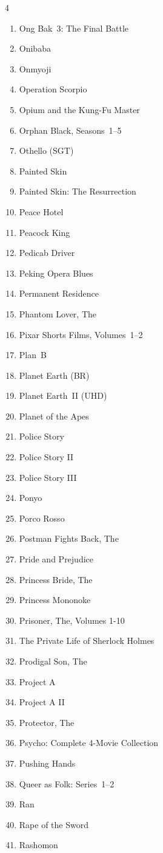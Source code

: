 \documentclass{article}
\begin{document}
\begin{multicols}{4}
\begin{enumerate}
\item Ong Bak~3: The Final Battle
\item Onibaba
\item Onmyoji
\item Operation Scorpio
\item Opium and the Kung-Fu Master
\item Orphan Black, Seasons~1--5
\item Othello (SGT)
\item Painted Skin
\item Painted Skin: The Resurrection
\item Peace Hotel
\item Peacock King
\item Pedicab Driver
\item Peking Opera Blues
\item Permanent Residence
\item Phantom Lover, The
\item Pixar Shorts Films, Volumes~1--2
\item Plan~B
\item Planet Earth (BR)
\item Planet Earth~II (UHD)
\item Planet of the Apes
\item Police Story
\item Police Story II
\item Police Story III
\item Ponyo
\item Porco Rosso
\item Postman Fights Back, The
\item Pride and Prejudice
\item Princess Bride, The
\item Princess Mononoke
\item Prisoner, The, Volumes 1-10
\item The Private Life of Sherlock Holmes
\item Prodigal Son, The
\item Project A
\item Project A II
\item Protector, The
\item Psycho: Complete 4-Movie Collection
\item Pushing Hands
\item Queer as Folk: Series~1--2
\item Ran
\item Rape of the Sword
\item Rashomon

\end{enumerate}
\end{multicols}
\end{document}
